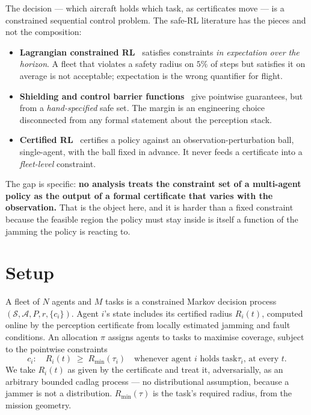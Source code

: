 \documentclass[11pt,a4paper]{article}
\newcommand{\Rmin}{R_{\min}}
\newcommand{\Ri}{R_i}
\begin{document}
The decision --- which aircraft holds which task, as certificates move --- is a
constrained sequential control problem. The safe-RL literature has the pieces
and not the composition:

\begin{itemize}
\item \textbf{Lagrangian constrained RL}~\cite{achiam2017cpo,paternain2019zeroduality}
  satisfies constraints \emph{in expectation over the horizon}. A fleet that
  violates a safety radius on $5\%$ of steps but satisfies it on average is not
  acceptable; expectation is the wrong quantifier for flight.
\item \textbf{Shielding and control barrier functions}~\cite{alshiekh2018shielding,ames2019cbf}
  give pointwise guarantees, but from a \emph{hand-specified} safe set. The
  margin is an engineering choice disconnected from any formal statement about
  the perception stack.
\item \textbf{Certified RL}~\cite{wu2022crop,yang2024carol} certifies a policy
  against an observation-perturbation ball, single-agent, with the ball fixed in
  advance. It never feeds a certificate into a \emph{fleet-level} constraint.
\end{itemize}

\noindent
The gap is specific: \textbf{no analysis treats the constraint set of a
multi-agent policy as the output of a formal certificate that varies with the
observation.} That is the object here, and it is harder than a fixed constraint
because the feasible region the policy must stay inside is itself a function of
the jamming the policy is reacting to.

\section{Setup}
A fleet of $N$ agents and $M$ tasks is a constrained Markov decision
process~\cite{altman1999cmdp} $(\mathcal S,\mathcal A,P,r,\{c_i\})$. Agent $i$'s
state includes its certified radius $\Ri(t)$, computed online by the perception
certificate from locally estimated jamming and fault conditions. An allocation
$\pi$ assigns agents to tasks to maximise coverage, subject to the pointwise
constraints
\begin{equation}
\label{eq:constraint}
c_i:\quad \Ri(t)\;\ge\;\Rmin(\tau_i)\quad\text{whenever agent $i$ holds task
$\tau_i$, at every $t$.}
\end{equation}
We take $\Ri(t)$ as given by the certificate and treat it, adversarially, as an
arbitrary bounded cadlag process --- no distributional assumption, because a
jammer is not a distribution. $\Rmin(\tau)$ is the task's required radius, from
the mission geometry.
\end{document}

